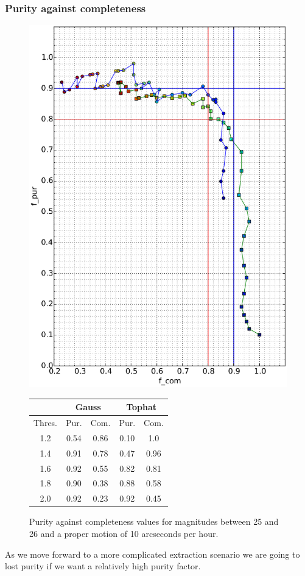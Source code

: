\documentclass{article}
\begin{document}
\subsubsection{Purity against completeness}
\begin{figure}[H]
\centering
\includegraphics[width=.55\linewidth]{images/25_26_10_f.eps}
\qquad
\begin{tabular}[b]{|c|c|c|c|c|}\hline
\multicolumn{1}{|c|}{} & \multicolumn{2}{c|}{Gauss} & \multicolumn{2}{c|}{Tophat} \\
\hline \hline
Thres. & Pur. & Com. & Pur. & Com.\\
\hline
1.2 & 0.54 & 0.86 & 0.10 & 1.0\\
\hline
1.4 & 0.91 & 0.78 & 0.47 & 0.96\\
\hline
1.6 & 0.92 & 0.55 & 0.82 & 0.81\\
\hline
1.8 & 0.90 & 0.38 & 0.88 & 0.58\\
\hline
2.0 & 0.92 & 0.23 & 0.92 & 0.45\\
\hline
\end{tabular}
\captionsetup{labelformat=andtable}
\caption{Purity against completeness values for magnitudes between 25 and 26 and a proper motion of 10 arcseconds per hour.}
\end{figure}

As we move forward to a more complicated extraction scenario we are going to lost purity if we want a relatively high purity factor.
\end{document}
